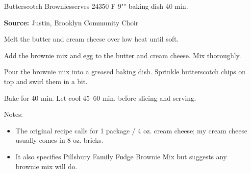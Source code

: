 \begin{recipe}{Butterscotch Brownies}{serves 24}{350\0 F \hfill 9"" baking dish \hfill 40 min.}

 \freeform \textbf{Source:} Justin, Brooklyn Community Choir

 Melt the butter and cream cheese over low heat until soft.

 Add the brownie mix and egg to the butter and cream cheese. Mix thoroughly.

 Pour the brownie mix into a greased baking dish. Sprinkle butterscotch chips on top and swirl them in a bit.

 \newstep Bake for 40 min. Let cool 45--60 min. before slicing and serving.

 \freeform Notes:
 \begin{itemize}
  \item The original recipe calls for 1 package / 4 oz. cream cheese; my cream cheese usually comes in 8 oz. bricks.
  \item It also specifies Pillsbury Family Fudge Brownie Mix but suggests any brownie mix will do.
 \end{itemize}
\end{recipe}
